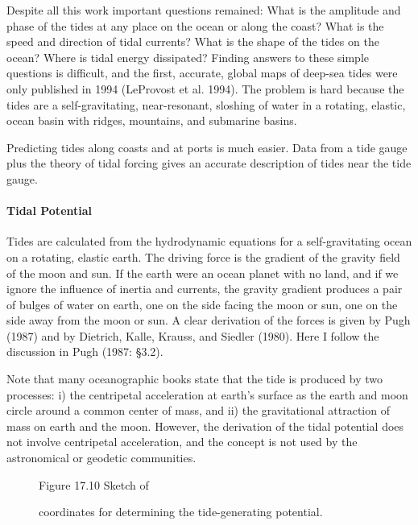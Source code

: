 Despite all this work important questions remained: What is the amplitude
and phase of the tides at any place on the ocean or along the coast? What is the
speed and direction of tidal currents?  What is the shape of the tides on the ocean?
Where is tidal energy dissipated? Finding answers to these simple questions is
difficult, and the first, accurate, global maps of deep-sea tides were only
published in 1994 (LeProvost et al. 1994). The problem is hard because the tides
are a self-gravitating, near-resonant, sloshing of water in a rotating, elastic,
ocean basin with ridges, mountains, and submarine basins.

Predicting tides along coasts and at ports is much easier. Data from a tide gauge
plus the theory of tidal forcing gives an accurate description of tides near the
tide gauge.

\paragraph{Tidal Potential}
Tides are calculated from the hydrodynamic equations for a self-gravitating ocean on a rotating, elastic earth. The driving force is the gradient of the gravity field of the moon and sun. If the earth were an ocean planet with no land, and if we ignore the influence of inertia and currents, the gravity gradient produces a pair of bulges of water on earth, one on the side facing the moon or sun, one on the side away from the moon or sun. A clear derivation of the forces is given by Pugh (1987) and by Dietrich, Kalle, Krauss, and Siedler (1980). Here I follow the discussion in Pugh (1987: \S 3.2).

Note that many oceanographic books state that the tide is produced by two processes: i) the centripetal acceleration at earth's surface as the earth and moon circle around a common center of mass, and ii) the gravitational attraction of mass on earth and the moon. However, the derivation of the tidal potential does not involve centripetal acceleration, and the concept is not used by the astronomical or geodetic communities. 

\begin{figure}[h!]
\footnotesize
\centering
Figure 17.10 Sketch of \rule{0mm}{4ex}coordinates for determining the tide-generating potential.

\label{fig:tidesketch}
\vspace{-1ex}
\end{figure}

